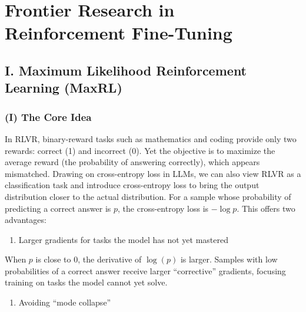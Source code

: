 \setcounter{section}{4}

\hypertarget{frontier-research-in-reinforcement-fine-tuning}{%
\section{Frontier Research in Reinforcement Fine-Tuning}\label{frontier-research-in-reinforcement-fine-tuning}}

\hypertarget{i.-maximum-likelihood-reinforcement-learning-maxrl}{%
\subsection{I. Maximum Likelihood Reinforcement Learning (MaxRL)}\label{i.-maximum-likelihood-reinforcement-learning-maxrl}}

\hypertarget{i-the-core-idea}{%
\subsubsection{(I) The Core Idea}\label{i-the-core-idea}}

In RLVR, binary-reward tasks such as mathematics and coding provide only two rewards: correct (1) and incorrect (0). Yet the objective is to maximize the average reward (the probability of answering correctly), which appears mismatched. Drawing on cross-entropy loss in LLMs, we can also view RLVR as a classification task and introduce cross-entropy loss to bring the output distribution closer to the actual distribution. For a sample whose probability of predicting a correct answer is \(p\), the cross-entropy loss is \(-\log p\). This offers two advantages:

\begin{enumerate}
\def\labelenumi{\arabic{enumi}.}
\tightlist
\item
  Larger gradients for tasks the model has not yet mastered
\end{enumerate}

When \(p\) is close to 0, the derivative of \(\log(p)\) is larger. Samples with low probabilities of a correct answer receive larger ``corrective'' gradients, focusing training on tasks the model cannot yet solve.

\begin{enumerate}
\def\labelenumi{\arabic{enumi}.}
\setcounter{enumi}{1}
\tightlist
\item
  Avoiding ``mode collapse''
\end{enumerate}

